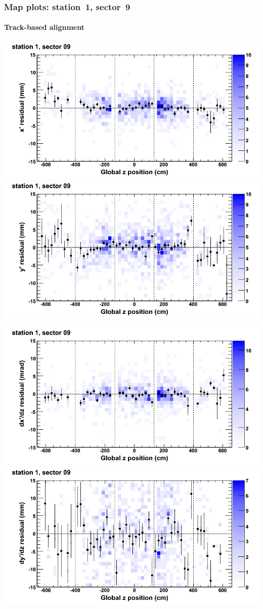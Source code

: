 \documentclass[compress]{beamer}
\begin{document}
\begin{frame}
\frametitle{Map plots: station~1, sector~9}
\framesubtitle{Track-based alignment}
\includegraphics[width=0.5\linewidth]{mapplots_re05/DTvsz_st1sec09_x.png}
\includegraphics[width=0.5\linewidth]{mapplots_re05/DTvsz_st1sec09_y.png}

\includegraphics[width=0.5\linewidth]{mapplots_re05/DTvsz_st1sec09_dxdz.png}
\includegraphics[width=0.5\linewidth]{mapplots_re05/DTvsz_st1sec09_dydz.png}
\end{frame}
\end{document}
